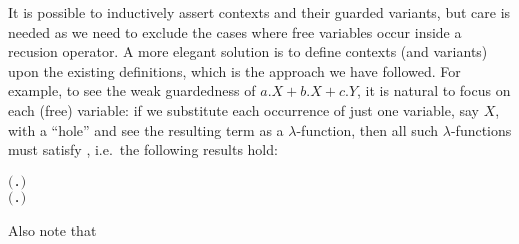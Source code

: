 It is possible to inductively assert \multivariate contexts and their
guarded variants, but care is needed as  we need to exclude the cases where
free variables occur inside a recusion operator. A more elegant
 solution is to define \multivariate contexts (and variants) upon the
existing \univariate definitions, which is the approach we have followed.
For example, to see the weak guardedness of $a.X + b.X + c.Y$, it is
natural to focus on each (free) variable: if we substitute each
occurrence of just one variable, say $X$, with a ``hole'' and see the
resulting term as a $\lambda$-function, then all such $\lambda$-functions
must satisfy , i.e.~the following results hold:
\begin{alltt}
\HOLTokenTurnstile{}  \ensuremath{(}\HOLTokenLambda{}. \HOLSymConst{\ensuremath{\ldotp}} \HOLSymConst{\ensuremath{+}} \HOLSymConst{\ensuremath{\ldotp}} \HOLSymConst{\ensuremath{+}} \HOLSymConst{\ensuremath{\ldotp}} \ensuremath{)}
\HOLTokenTurnstile{}  \ensuremath{(}\HOLTokenLambda{}. \HOLSymConst{\ensuremath{\ldotp}}  \HOLSymConst{\ensuremath{+}} \HOLSymConst{\ensuremath{\ldotp}}  \HOLSymConst{\ensuremath{+}} \HOLSymConst{\ensuremath{\ldotp}}\ensuremath{)}
\end{alltt}
Also note that 
